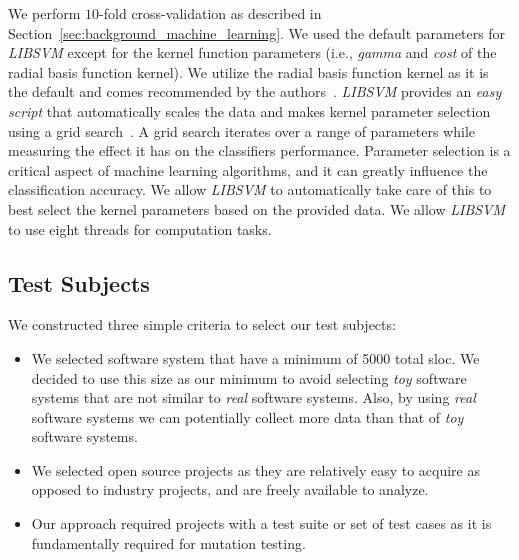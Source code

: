 We perform $10$-fold cross-validation as described in Section~\ref{sec:background_machine_learning}. We used the default parameters for \emph{LIBSVM} except for the kernel function parameters (i.e., \emph{gamma} and \emph{cost} of the radial basis function kernel). We utilize the radial basis function kernel as it is the default and comes recommended by the authors~\cite{HCL03}. \emph{LIBSVM} provides an \emph{easy script} that automatically scales the data and makes kernel parameter selection using a grid search~\cite{HCL03}. A grid search iterates over a range of parameters while measuring the effect it has on the classifiers performance. Parameter selection is a critical aspect of machine learning algorithms, and it can greatly influence the classification accuracy. We allow \emph{LIBSVM} to automatically take care of this to best select the kernel parameters based on the provided data. We allow \emph{LIBSVM} to use eight threads for computation tasks.

\subsection{Test Subjects}
\label{subsec:experiment_test_subjects}
We constructed three simple criteria to select our test subjects:

\begin{itemize}
  \item We selected software system that have a minimum of 5000 total \gls{sloc}. We decided to use this size as our minimum to avoid selecting \emph{toy} software systems that are not similar to \emph{real} software systems. Also, by using \emph{real} software systems we can potentially collect more data than that of \emph{toy} software systems.
  \item We selected open source projects as they are relatively easy to acquire as opposed to industry projects, and are freely available to analyze.
  \item Our approach required projects with a test suite or set of test cases as it is fundamentally required for mutation testing.
\end{itemize}

